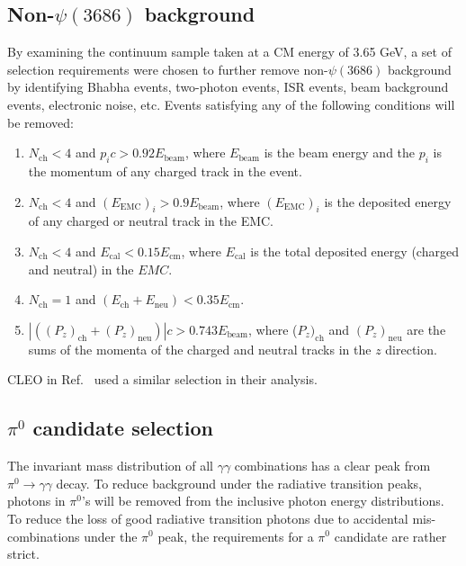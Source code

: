 \documentclass[aps,prd,twocolumn,showpacs,floatfix,byrevtex]{revtex4-1}
\begin{document}
\subsection{\boldmath Non-$\psi(3686)$ background}
\label{non_psi_bkg}
By examining the continuum sample taken at a CM energy of
3.65 GeV, a set of selection requirements were chosen to further
remove non-$\psi(3686)$ background by identifying Bhabha events,
two-photon events, ISR events, beam background events, electronic
noise, etc.  Events satisfying any of the following conditions will
be removed:
\begin{enumerate}
\item $N_{\text{ch}} <4$ and $p_{i}c > 0.92 E_{\text{beam}}$, where $E_{\text{beam}}$ is the beam energy and the
$p_i$ is the momentum of any charged track in the event.
\item  $N_{\text{ch}} <4$ and $(E_{\text{EMC}})_{i} > 0.9 E_{\text{beam}}$, where  $(E_{\text{EMC}})_i$ is the
deposited energy of any charged or neutral track in the EMC.
\item $N_{\text{ch}} <4$ and $E_{\text{cal}} < 0.15 E_{\text{cm}}$,
  where $E_{\text{cal}}$ is the total deposited energy (charged
  and neutral) in the $EMC$.
\item $N_{\text{ch}} = 1$ and $(E_{\text{ch}} + E_{\text{neu}}) < 0.35 E_{\text{cm}}$. 
\item $|((P_z)_{\text{ch}} + (P_z)_{\text{neu}})|c > 0.743E_{\text{beam}}$, where ($P_z)_{\text{ch}}$
and $(P_z)_{\text{neu}}$ are the sums of the momenta of the charged and
neutral tracks in the $z$ direction.
\end{enumerate}
CLEO in Ref.~\cite{cleo04} used a similar selection in their
analysis.

\subsection{\boldmath $\pi^0$ candidate selection}
\label{good-pi0}
The invariant mass distribution of all $\gamma \gamma$ combinations
has a clear peak from $\pi^0 \to \gamma \gamma$ decay.  To reduce
background under the radiative transition peaks, photons in $\pi^0$'s
will be removed from the inclusive photon energy distributions.  To
reduce the loss of good radiative transition photons due to accidental
mis-combinations under the $\pi^0$ peak, the requirements for a
$\pi^0$ candidate are rather strict.
\end{document}
